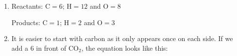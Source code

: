 {\begin{mdframed}[linewidth=4, leftmargin=40, rightmargin=40]
\begin{exercise}
\begin{enumerate}[noitemsep, label=\textbf{Step} \textbf{\arabic*}. ]
        \item  
        \label{m38726*id64900}Reactants: \begin{math}\mathrm{C}=6\end{math}; \begin{math}\mathrm{H}=12\end{math} and \begin{math}\mathrm{O}=8\end{math} \par 
        \label{m38726*id64903}Products: \begin{math}\mathrm{C}=1\end{math}; \begin{math}\mathrm{H}=2\end{math} and \begin{math}\mathrm{O}=3\end{math}\par 
        \item  
        \label{m38726*id64912}It is easier to start with carbon as it only appears once on each side. If we add a 6 in front of \begin{math}{\mathrm{CO}}_{2}\end{math}, the equation looks like this:
\label{m38726*uid0913}\nopagebreak\noindent{}
\end{enumerate}
\end{exercise}
\end{mdframed}}
